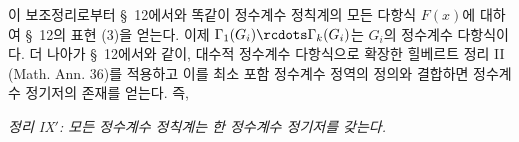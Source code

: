 
이 보조정리로부터 \S\ 12에서와 똑같이 정수계수 정칙계의 모든 다항식 $F(x)$에 대하여 \S\ 12의 표현 (3)을 얻는다. 이제 $\Gamma_1(G_i)\rcdots\Gamma_k(G_i)$는 $G_i$의 정수계수 다항식이다. 더 나아가 \S\ 12에서와 같이, 대수적 정수계수 다항식으로 확장한 힐베르트 정리 II (Math. Ann. 36)를 적용하고 이를 최소 포함 정수계수 정역의 정의와 결합하면 정수계수 정기저의 존재를 얻는다. 즉,

\emph{정리 IX$'$: 모든 정수계수 정칙계는 한 정수계수 정기저를 갖는다.}
